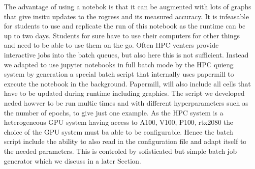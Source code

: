 The advantage of using a notebok is that it can be augmented with lots
of graphs that give insitu updates to the rogress and its measured
accuracy. It is infeasable for students to use and replicate the run
of this notebook as the runtime can be up to two days. Students for
sure have to use their computers for other things and need to be able
to use them on the go. Often HPC venters provide interactive jobs into
the batch queues, but also here this is not sufficient. Instead we
adapted to use jupyter notebooks in full batch mode by the HPC quieng
system by generation a special batch script that internally uses
papermill to execute the notebook in the background. Papermill, will
also include all cells that have to be updated during runtime
including graphics. The script we developed neded howver to be run
multie times and with different hyperparameters such as the number of
epochs, to give just one example. As the HPC system is a heterogeneous
GPU system having access to A100, V100, P100, rtx2080 the choice of
the GPU system must ba able to be configurable. Hence the batch script
include the ability to also read in the configuration file and adapt
itself to the needed parameters. This is controled by sofisticated but
simple batch job generator which we discuss in a later Section.



